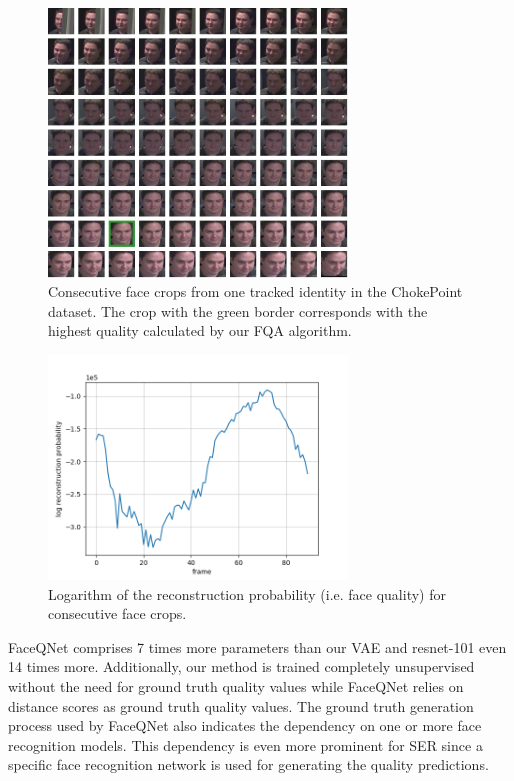 \documentclass[letterpaper]{article} %
\begin{document}
\begin{figure}[h!]
    \centering
    \includegraphics[width=225pt]{figures/cp_map_0.jpg}
    \caption{Consecutive face crops from one tracked identity in the ChokePoint dataset. The crop with the green border corresponds with the highest quality calculated by our FQA algorithm.}
    \label{fig:cp_map_0}
\end{figure}
\begin{figure}[h!]
    \centering
    \includegraphics[width=225pt]{figures/cp_plot_0.png}
    \caption{Logarithm of the reconstruction probability (i.e. face quality) for consecutive face crops.}
    \label{fig:cp_plot_0}
\end{figure}
FaceQNet comprises 7 times more parameters than our VAE and resnet-101 even 14 times more. Additionally, our method is trained completely unsupervised without the need for ground truth quality values while FaceQNet relies on distance scores as ground truth quality values. The ground truth generation process used by FaceQNet also indicates the dependency on one or more face recognition models. This dependency is even more prominent for SER since a specific face recognition network is used for generating the quality predictions.
\end{document}
